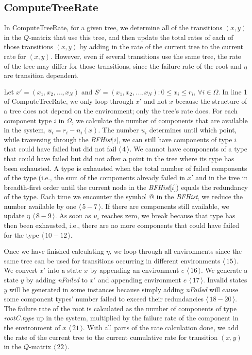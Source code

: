 \documentclass[12pt]{article}
\newcommand{\varName}[1]{\textrm{\it#1}}
\newcommand{\citeLine}[1]{$\langle \, #1 \, \rangle$}
\newcommand{\citeBlock}[2]{$\langle \, #1 - #2 \, \rangle$}
\begin{document}
\subsection{ComputeTreeRate}

In ComputeTreeRate, for a given tree, we determine all of the transitions $(x, y)$ in the $Q$-matrix that use this tree, and then update the total rates of each of those transitions $(x, y)$ by adding in the rate of the current tree to the current rate for $(x, y)$. However, even if several transitions use the same tree, the rate of the tree may differ for those transitions, since the failure rate of the root and $\eta$ are transition dependent.

Let $x' = (x_{1}, x_{2}, \ldots, x_{N})$ and $S' = (x_{1}, x_{2}, \ldots, x_{N}): 0 \leq x_{i} \leq r_{i}, \, \forall i \in \Omega$. In line 1 of ComputeTreeRate, we only loop through $x'$ and not $x$ because the structure of a tree does not depend on the environment; only the tree's rate does. For each component type $i$ in $\Omega$, we calculate the number of components that are available in the system, $u_{i} = r_{i} - n_{i}(x)$. The number $u_{i}$ determines until which point, while traversing through the \varName{BFHist}[$i$], we can still have components of type $i$ that could have failed but did not fail \citeLine{4}. We cannot have components of a type that could have failed but did not after a point in the tree where its type has been exhausted. A type is exhausted when the total number of failed components of the type (i.e., the sum of the components already failed in $x'$ and in the tree in breadth-first order until the current node in the \varName{BFHist}[$i$]) equals the redundancy of the type. Each time we encounter the symbol @ in the \varName{BFHist}, we reduce the number available by one \citeBlock{5}{7}. If there are components still available, we update $\eta$ \citeBlock{8}{9}. As soon as $u_{i}$ reaches zero, we break because that type has then been exhausted, i.e., there are no more components that could have failed for the type \citeBlock{10}{12}.

Once we have finished calculating $\eta$, we loop through all environments since the same tree can be used for transitions occurring in different environments \citeLine{15}. We convert $x'$ into a state $x$ by appending an environment $e$ \citeLine{16}. We generate a state $y$ by adding \varName{nFailed} to $x'$ and appending environment $e$ \citeLine{17}. Invalid states $y$ will be generated in some instances because simply adding \varName{nFailed} will cause some component types' number failed to exceed their redundancies \citeBlock{18}{20}. The failure rate of the root is calculated as the number of components of type \varName{rootC.type} up in the system, multiplied by the failure rate of the component in the environment of $x$ \citeLine{21}. With all parts of the rate calculation done, we add the rate of the current tree to the current cumulative rate for transition $(x, y)$ in the $Q$-matrix \citeLine{22}.
\end{document}
